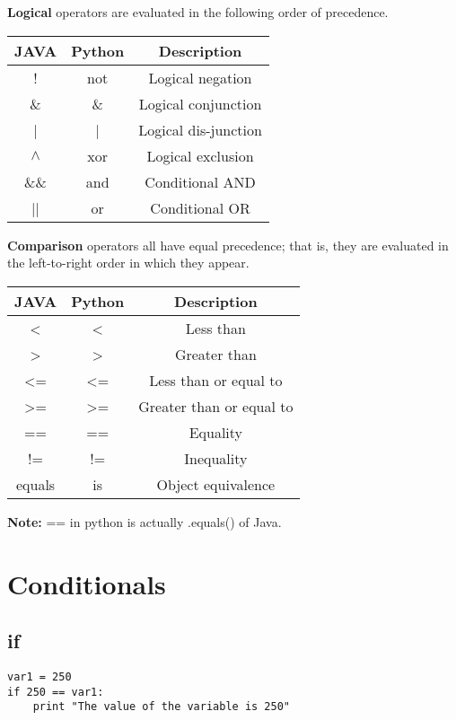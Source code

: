 \documentclass[a4paper,9pt]{extarticle}
\begin{document}
\begin{multicols*}{2}
\textbf{Logical} operators are evaluated in the following order of precedence.

\begin{center}
 \begin{tabular}{||c | c | c||}
 \hline
 \textbf{JAVA} & \textbf{Python} & \textbf{Description}\\ [1ex]
 \hline\hline
  ! & not & Logical negation\\
 \hline
 \&  & \& & Logical conjunction\\
 \hline
 | & | & Logical dis-junction\\
 \hline
 $\wedge$ & xor & Logical exclusion \\
 \hline
  \&\& & and & Conditional AND\\
 \hline
  || & or & Conditional OR\\
 \hline
\end{tabular}
\end{center}

\textbf{Comparison} operators all have equal precedence; that is, they are evaluated in the left-to-right order in which they appear.

\begin{center}
 \begin{tabular}{||c | c | c||}
 \hline
 \textbf{JAVA} & \textbf{Python} & \textbf{Description}\\ [1ex]
 \hline\hline
 < & < & Less than\\
 \hline
 > & > & Greater than\\
 \hline
 <= & <= & Less than or equal to \\
 \hline
  >= & >= & Greater than or equal to\\
 \hline
  == & == & Equality\\
 \hline
 != & != & Inequality\\
 \hline
 equals & is & Object equivalence \\
 \hline
\end{tabular}
\end{center}
\textbf{Note: } == in python is actually .equals() of Java.
\vspace{5 mm}

\section{Conditionals}
\subsection{if}
\begin{lstlisting}
var1 = 250
if 250 == var1:
    print "The value of the variable is 250"
\end{lstlisting}
\vspace{5 mm}


\end{multicols*}
\end{document}
